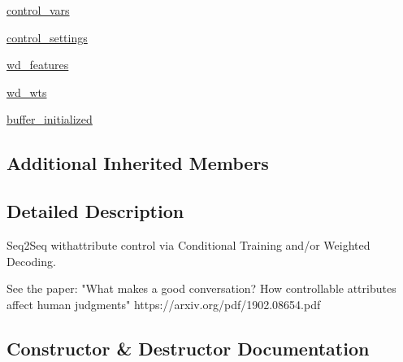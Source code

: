 \begin{DoxyCompactItemize}
\item 
\hyperlink{classprojects_1_1controllable__dialogue_1_1controllable__seq2seq_1_1controllable__seq2seq_1_1ControllableSeq2seqAgent_a60964f1450ffcd6b3ab7696a64e48cd5}{control\+\_\+vars}
\item 
\hyperlink{classprojects_1_1controllable__dialogue_1_1controllable__seq2seq_1_1controllable__seq2seq_1_1ControllableSeq2seqAgent_a10e17fad8f2e68b1610f64dc7d262d1a}{control\+\_\+settings}
\item 
\hyperlink{classprojects_1_1controllable__dialogue_1_1controllable__seq2seq_1_1controllable__seq2seq_1_1ControllableSeq2seqAgent_ae7d42c61a184691bb15d1ea65aee4c72}{wd\+\_\+features}
\item 
\hyperlink{classprojects_1_1controllable__dialogue_1_1controllable__seq2seq_1_1controllable__seq2seq_1_1ControllableSeq2seqAgent_a74800af89333cc27f221ed70dff41e4e}{wd\+\_\+wts}
\item 
\hyperlink{classprojects_1_1controllable__dialogue_1_1controllable__seq2seq_1_1controllable__seq2seq_1_1ControllableSeq2seqAgent_af675df0b6aa0c683d5da13151a82abe4}{buffer\+\_\+initialized}
\end{DoxyCompactItemize}
\subsection*{Additional Inherited Members}


\subsection{Detailed Description}
\begin{DoxyVerb}Seq2Seq withattribute control via Conditional Training and/or Weighted Decoding.

See the paper: "What makes a good conversation? How controllable attributes affect
human judgments" https://arxiv.org/pdf/1902.08654.pdf
\end{DoxyVerb}
 

\subsection{Constructor \& Destructor Documentation}
\mbox{\label{classprojects_1_1controllable__dialogue_1_1controllable__seq2seq_1_1controllable__seq2seq_1_1ControllableSeq2seqAgent_a0b06e6eba29a724b49b08cc9267f0862}} 
